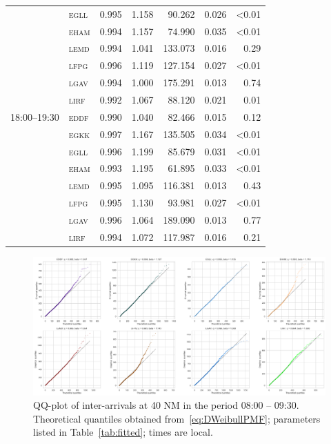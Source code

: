 \documentclass[]{elsarticle}
\newcommand{\airp}[1]{\textcolor{#1}{\textsc{#1}}}
\begin{document}
\begin{table}
\begin{tabular}{llrrrrr}
                   & \airp{egll} & 0.995 &   1.158 &  90.262 &     0.026 &     <0.01 \\
                   & \airp{eham} & 0.994 &   1.157 &  74.990 &     0.035 &     <0.01 \\
                   & \airp{lemd} & 0.994 &   1.041 & 133.073 &     0.016 &      0.29 \\
                   & \airp{lfpg} & 0.996 &   1.119 & 127.154 &     0.027 &     <0.01 \\
                   & \airp{lgav} & 0.994 &   1.000 & 175.291 &     0.013 &      0.74 \\
                   & \airp{lirf} & 0.992 &   1.067 &  88.120 &     0.021 &      0.01 \\
      18:00--19:30 & \airp{eddf} & 0.990 &   1.040 &  82.466 &     0.015 &      0.12 \\
                   & \airp{egkk} & 0.997 &   1.167 & 135.505 &     0.034 &     <0.01 \\
                   & \airp{egll} & 0.996 &   1.199 &  85.679 &     0.031 &     <0.01 \\
                   & \airp{eham} & 0.993 &   1.195 &  61.895 &     0.033 &     <0.01 \\
                   & \airp{lemd} & 0.995 &   1.095 & 116.381 &     0.013 &      0.43 \\
                   & \airp{lfpg} & 0.995 &   1.130 &  93.981 &     0.027 &     <0.01 \\
                   & \airp{lgav} & 0.996 &   1.064 & 189.090 &     0.013 &      0.77 \\
                   & \airp{lirf} & 0.994 &   1.072 & 117.987 &     0.016 &      0.21 \\
      \bottomrule
    \end{tabular}
\end{table}

\begin{figure}
    \includegraphics[width=\textwidth]{IA_qqplot0800-0930}
    \caption{QQ-plot of inter-arrivals at 40 NM in the period 08:00 -- 09:30. Theoretical quantiles obtained from~\eqref{eq:DWeibullPMF}; parameters listed in Table~\ref{tab:fitted}; times are local.}
    \label{fig:qqplot5-8}
\end{figure}
\end{document}
